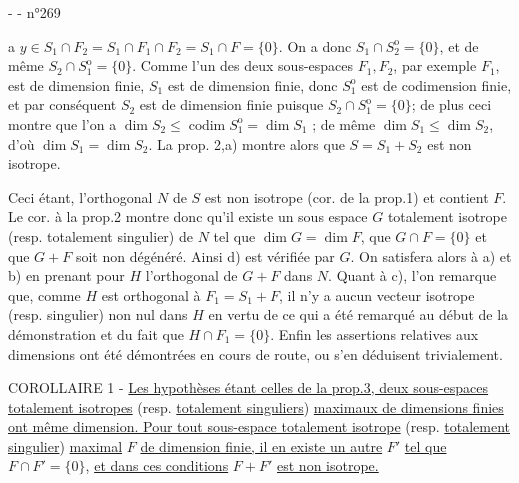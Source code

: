 -  -
\hfill n°269

a $y\in S_1\cap F_2=S_1\cap F_1\cap F_2=S_1\cap F=\{0\}$. On a donc $S_1\cap S_2^{\mathrm o}=\{0\}$, et de même $S_2\cap S_1^{\mathrm o}=\{0\}$. Comme l'un des deux sous-espaces $F_1,F_2$, par exemple $F_1$, est de dimension finie, $S_1$ est de dimension finie, donc $S_1^{\mathrm o}$ est de codimension finie, et par conséquent $S_2$ est de dimension finie puisque $S_2\cap S_1^{\mathrm o}=\{0\}$; de plus ceci montre que l'on a $\dim S_2\leq\operatorname{codim}S_1^{\mathrm o}=\dim S_1$ ; de même $\dim S_1\leq\dim S_2$, d'où $\dim S_1=\dim S_2$. La prop. 2,a) montre alors que $S=S_1+S_2$ est non isotrope.

Ceci étant, l'orthogonal $N$ de $S$ est non isotrope (cor. de la prop.1) et contient $F$. Le cor. à la prop.2 montre donc qu'il existe un sous espace $G$ totalement isotrope (resp. totalement singulier) de $N$ tel que $\dim G=\dim F$, que $G\cap F=\{0\}$ et que $G+F$ soit non dégénéré. Ainsi d) est vérifiée par $G$. On satisfera alors à a) et b) en prenant pour $H$ l'orthogonal de $G+F$ dans $N$. Quant à c), l'on remarque que, comme $H$ est orthogonal à $F_1=S_1+F$, il n'y a aucun vecteur isotrope (resp. singulier) non nul dans $H$ en vertu de ce qui a été remarqué au début de la démonstration et du fait que $H\cap F_1=\{0\}$. Enfin les assertions relatives aux dimensions ont été démontrées en cours de route, ou s'en déduisent trivialement.

COROLLAIRE 1 - \uline{Les hypothèses étant celles de la prop.3, deux sous-espaces totalement isotropes} (resp. \uline{totalement singuliers}) \uline{maximaux de dimensions finies ont même dimension. Pour tout sous-espace totalement isotrope} (resp. \uline{totalement singulier}) \uline{maximal} $F$ \uline{de dimension finie, il en existe un autre} $F'$ \uline{tel que} $F\cap F'=\{0\}$, \uline{et dans ces conditions} $F+F'$ \uline{est non isotrope.}
